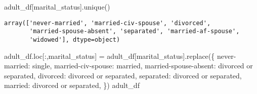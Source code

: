 \documentclass[
  letterpaper,
  DIV=11,
  numbers=noendperiod]{scrartcl}
\newenvironment{Shaded}{\begin{snugshade}}{\end{snugshade}}
\newcommand{\NormalTok}[1]{\textcolor[rgb]{0.00,0.23,0.31}{#1}}
\newcommand{\OperatorTok}[1]{\textcolor[rgb]{0.37,0.37,0.37}{#1}}
\newcommand{\StringTok}[1]{\textcolor[rgb]{0.13,0.47,0.30}{#1}}
\begin{document}
\begin{Shaded}
\begin{Highlighting}[]
\NormalTok{adult\_df[}\StringTok{\textquotesingle{}marital\_status\textquotesingle{}}\NormalTok{].unique()}
\end{Highlighting}
\end{Shaded}

\begin{verbatim}
array(['never-married', 'married-civ-spouse', 'divorced',
       'married-spouse-absent', 'separated', 'married-af-spouse',
       'widowed'], dtype=object)
\end{verbatim}

\begin{Shaded}
\begin{Highlighting}[]
\NormalTok{adult\_df.loc[:,}\StringTok{\textquotesingle{}marital\_status\textquotesingle{}}\NormalTok{] }\OperatorTok{=}\NormalTok{ adult\_df[}\StringTok{\textquotesingle{}marital\_status\textquotesingle{}}\NormalTok{].replace(\{}
    \StringTok{\textquotesingle{}never{-}married\textquotesingle{}}\NormalTok{: }\StringTok{\textquotesingle{}single\textquotesingle{}}\NormalTok{,}
    \StringTok{\textquotesingle{}married{-}civ{-}spouse\textquotesingle{}}\NormalTok{: }\StringTok{\textquotesingle{}married\textquotesingle{}}\NormalTok{, }
    \StringTok{\textquotesingle{}married{-}spouse{-}absent\textquotesingle{}}\NormalTok{: }\StringTok{\textquotesingle{}divorced or separated\textquotesingle{}}\NormalTok{, }
    \StringTok{\textquotesingle{}divorced\textquotesingle{}}\NormalTok{: }\StringTok{\textquotesingle{}divorced or separated\textquotesingle{}}\NormalTok{, }
    \StringTok{\textquotesingle{}separated\textquotesingle{}}\NormalTok{: }\StringTok{\textquotesingle{}divorced or separated\textquotesingle{}}\NormalTok{, }
    \StringTok{\textquotesingle{}married\textquotesingle{}}\NormalTok{: }\StringTok{\textquotesingle{}divorced or separated\textquotesingle{}}\NormalTok{,  }
\NormalTok{\})}
\NormalTok{adult\_df}
\end{Highlighting}
\end{Shaded}
\end{document}
